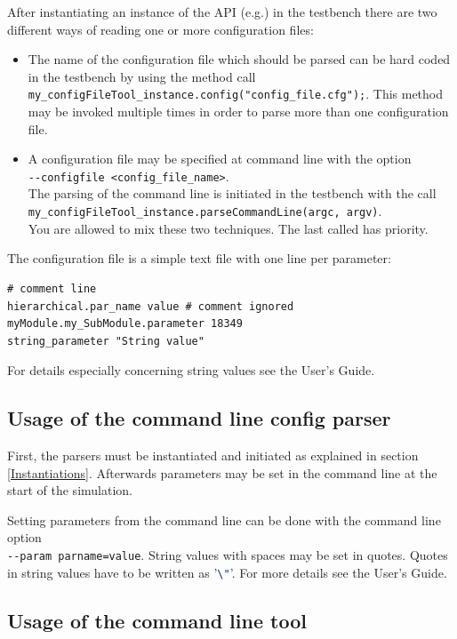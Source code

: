 After instantiating an instance of the API (e.g.) in the testbench there are two different ways of reading one or more configuration files:
\begin{itemize}
	\item The name of the configuration file which should be
parsed can be hard coded in the testbench by using the method call
\mbox{\lstinline[language=TeX]|my_configFileTool_instance.config("config_file.cfg");|}.
This method may be invoked multiple times in order to parse more than one configuration file.
	\item A configuration file may be specified at command line with the option \\ 
	\lstinline|--configfile <config_file_name>|. \\ The parsing of the command line is initiated in the testbench with the call \\ 
	\lstinline[language=TeX]|my_configFileTool_instance.parseCommandLine(argc, argv)|. \\
	You are allowed to mix these two techniques. The last called has priority. 
\end{itemize}

The configuration file is a simple text file with one line per parameter:
\begin{lstlisting}[language=TeX]
# comment line
hierarchical.par_name value # comment ignored
myModule.my_SubModule.parameter 18349
string_parameter "String value"
\end{lstlisting}

For details especially concerning string values see the User's Guide.


\subsection{Usage of the command line config parser}
\label{CommandLineConfigParser}

First, the parsers must be instantiated and initiated as explained in
section \ref{Instantiations}. Afterwards parameters may be set in the
command line at the start of the simulation.

Setting  parameters from the command line can be done with the command line option \\
\lstinline|--param parname=value|. String values with spaces may be set in quotes. Quotes in string values have to be written as '\lstinline[language=TeX]|\"|'. For more details see the User's Guide.


\subsection{Usage of the command line tool}
\label{CommandLineTool}

